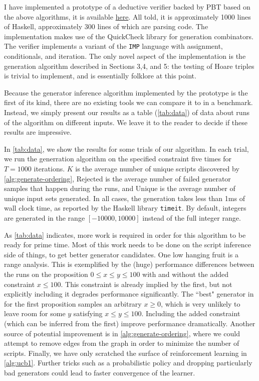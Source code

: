 \documentclass[sigconf,nonacm]{acmart}
\begin{document}
I have implemented a prototype of a deductive verifier backed by PBT based on the above algorithms, it is available \href{https://github.com/jdublu10/triple-testing}{here}. All told, it is approximately 1000 lines of Haskell, approximately 300 lines of which are parsing code. The implementation makes use of the QuickCheck library \cite{qc} for generation combinators. The verifier implements a variant of the \texttt{IMP} language \cite{imp}
with assignment, conditionals, and iteration. The only novel aspect of the implementation is the generation algorithm described in Sections 3,4, and 5: the testing of Hoare triples is trivial to implement, and is essentially folklore at this point.

Because the generator inference algorithm implemented by the prototype is the first of its kind, there are no existing tools we can compare it to in a benchmark. Instead, we simply present our results as a table (\autoref{tab:data}) of data about runs of the algorithm on different inputs. We leave it to the reader to decide if these results are impressive.

In \autoref{tab:data}, we show the results for some trials of our algorithm. In each trial, we run the generration algorithm on the specified constraint five times for $T = 1000$ iterations. $K$ is the average number of unique scripts discovered by \autoref{alg:generate-ordering}, Rejected is the average number of failed generator samples that happen during the runs, and Unique is the average number of unique input sets generated. In all cases, the generation takes less than 1ms of wall clock time, as reported by the Haskell library \texttt{timeit}. By default, integers are generated in the range $[-10000,10000]$ instead of the full integer range.

As \autoref{tab:data} indicates, more work is required in order for this algorithm to be ready for prime time. Most of this work needs to be done on the script inference side of things, to get better generator candidates. One low hanging fruit is a range analysis. This is exemplified by the (huge) performance differences between the runs on the proposition $0 \leq x \leq y \leq 100$ with and without the added constraint $x \leq 100$. This constraint is already implied by the first, but not explicitly including it degrades performance significantly. The ``best" generator in for the first proposition samples an arbitrary $x \geq 0$, which is very unlikely to leave room for some $y$ satisfying $x \leq y \leq 100$. Including the added constraint (which can be inferred from the first) improve performance dramatically. Another source of potential improvement is in \autoref{alg:generate-ordering}, where we could attempt to remove edges from the graph in order to minimize the number of scripts. Finally, we have only scratched the surface of reinforcement learning in \autoref{alg:ucb1}. Further tricks such as a probabilistic policy and dropping particularly bad generators could lead to faster convergence of the learner.
\end{document}

